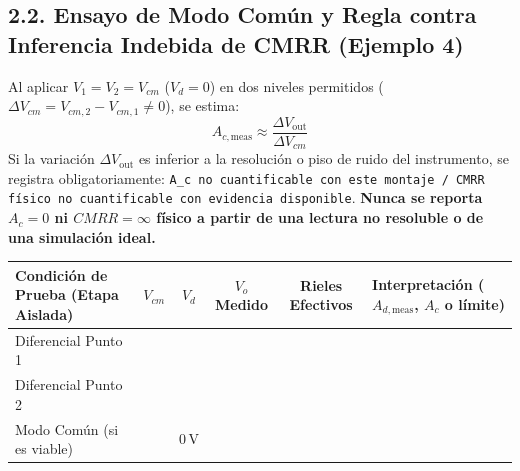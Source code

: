 \documentclass[10pt, a4paper]{article}
\begin{document}
\subsection*{2.2. Ensayo de Modo Común y Regla contra Inferencia Indebida de CMRR (Ejemplo 4)}
Al aplicar $V_1 = V_2 = V_{cm}$ ($V_d = 0$) en dos niveles permitidos ($\Delta V_{cm} = V_{cm,2} - V_{cm,1} \neq 0$), se estima:
\begin{equation}
    A_{c,\mathrm{meas}} \approx \frac{\Delta V_{\mathrm{out}}}{\Delta V_{cm}}
\end{equation}
Si la variación $\Delta V_{\mathrm{out}}$ es inferior a la resolución o piso de ruido del instrumento, se registra obligatoriamente: \texttt{A\_c no cuantificable con este montaje / CMRR físico no cuantificable con evidencia disponible}. \textbf{Nunca se reporta $A_c = 0$ ni $CMRR = \infty$ físico a partir de una lectura no resoluble o de una simulación ideal.}

\begin{table}[htbp]
    \centering
    \footnotesize
    \renewcommand{\arraystretch}{1.3}
    \begin{tabularx}{\textwidth}{|l|c|c|c|c|>{\raggedright\arraybackslash}X|}
    \hline
    \rowcolor[HTML]{EFEFEF} 
    \textbf{Condición de Prueba (Etapa Aislada)} & \textbf{$V_{cm}$} & \textbf{$V_d$} & \textbf{$V_o$ Medido} & \textbf{Rieles Efectivos} & \textbf{Interpretación ($A_{d,\mathrm{meas}}$, $A_c$ o límite)} \\ \hline
    Diferencial Punto 1 & & & & & \\ \hline
    Diferencial Punto 2 & & & & & \\ \hline
    Modo Común (si es viable) & & $0\,\text{V}$ & & & \\ \hline
    \end{tabularx}
\end{table}
\end{document}
